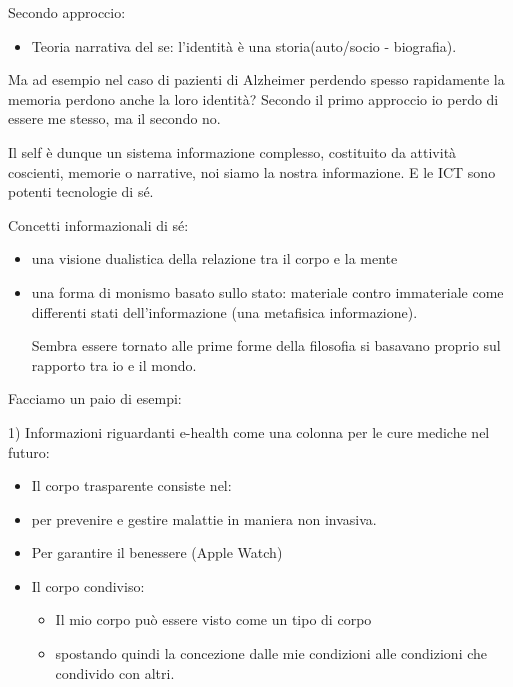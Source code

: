 \documentclass[a4page, 11pt]{article}
\begin{document}
Secondo approccio:

\begin{itemize}
	 
	\item
	Teoria narrativa del se: l'identità è una storia(auto/socio - biografia).
\end{itemize}

Ma ad esempio nel caso di pazienti di Alzheimer perdendo spesso
rapidamente la memoria perdono anche la loro identità? Secondo il primo
approccio io perdo di essere me stesso, ma il secondo no.

Il self è dunque un sistema informazione complesso, costituito da
attività coscienti, memorie o narrative, noi siamo la nostra
informazione. E le ICT sono potenti tecnologie di sé.

Concetti informazionali di sé:

\begin{itemize}
	\item
	una visione dualistica della relazione tra il corpo e la mente
	\item
	una forma di monismo basato sullo stato: materiale contro immateriale
	come differenti stati dell'informazione (una metafisica informazione).
	
	Sembra essere tornato alle prime forme della filosofia si basavano
	proprio sul rapporto tra io e il mondo.
\end{itemize}

Facciamo un paio di esempi:

1) Informazioni riguardanti e-health come una colonna per le cure
mediche nel futuro:

\begin{itemize}
	 
	\item
	Il corpo trasparente consiste nel:
\end{itemize}

\begin{itemize}
	 
	\item
	per prevenire e gestire malattie in maniera non invasiva.
	\item
	Per garantire il benessere (Apple Watch)
\end{itemize}

\begin{itemize}
	\item
	Il corpo condiviso:
	
	\begin{itemize}
		 
		\item
		Il mio corpo può essere visto come un tipo di corpo
		\item
		spostando quindi la concezione dalle mie condizioni alle condizioni
		che condivido con altri.
	\end{itemize}
\end{itemize}
\end{document}
